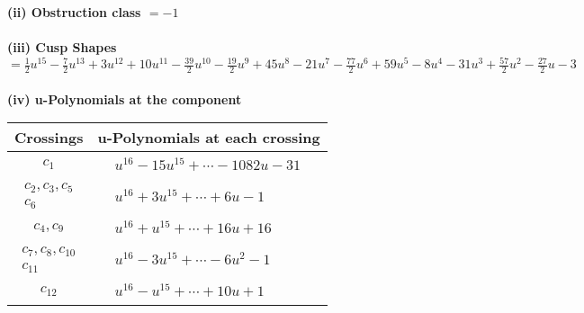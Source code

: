 \documentclass[1p]{elsarticle_modified}
\theoremstyle{definition}
\begin{document}
\flushleft \textbf{(ii) Obstruction class $= -1$}\\~\\
\flushleft \textbf{(iii) Cusp Shapes $= \frac{1}{2} u^{15}-\frac{7}{2} u^{13}+3 u^{12}+10 u^{11}-\frac{39}{2} u^{10}-\frac{19}{2} u^9+45 u^8-21 u^7-\frac{77}{2} u^6+59 u^5-8 u^4-31 u^3+\frac{57}{2} u^2-\frac{27}{2} u-3$}\\~\\
\newpage\renewcommand{\arraystretch}{1}
\flushleft \textbf{(iv) u-Polynomials at the component}\newline \\
\begin{tabular}{m{50pt}|m{274pt}}
Crossings & \hspace{64pt}u-Polynomials at each crossing \\
\hline $$\begin{aligned}c_{1}\end{aligned}$$&$\begin{aligned}
&u^{16}-15 u^{15}+\cdots-1082 u-31
\end{aligned}$\\
\hline $$\begin{aligned}c_{2},c_{3},c_{5}\\c_{6}\end{aligned}$$&$\begin{aligned}
&u^{16}+3 u^{15}+\cdots+6 u-1
\end{aligned}$\\
\hline $$\begin{aligned}c_{4},c_{9}\end{aligned}$$&$\begin{aligned}
&u^{16}+u^{15}+\cdots+16 u+16
\end{aligned}$\\
\hline $$\begin{aligned}c_{7},c_{8},c_{10}\\c_{11}\end{aligned}$$&$\begin{aligned}
&u^{16}-3 u^{15}+\cdots-6 u^2-1
\end{aligned}$\\
\hline $$\begin{aligned}c_{12}\end{aligned}$$&$\begin{aligned}
&u^{16}- u^{15}+\cdots+10 u+1
\end{aligned}$\\
\hline
\end{tabular}\\~\\
\end{document}
